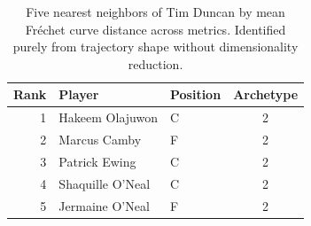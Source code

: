 \begin{table}[htbp]
  \centering\small
  \begin{tabular}{rllc}
    \toprule
    Rank & Player & Position & Archetype \\
    \midrule
    1 & Hakeem Olajuwon & C & 2 \\
    2 & Marcus Camby & F & 2 \\
    3 & Patrick Ewing & C & 2 \\
    4 & Shaquille O'Neal & C & 2 \\
    5 & Jermaine O'Neal & F & 2 \\
    \bottomrule
  \end{tabular}
  \caption{Five nearest neighbors of Tim Duncan by mean Fr\'{e}chet curve distance across metrics. Identified purely from trajectory shape without dimensionality reduction.}
  \label{tab:Tim_Duncan_frechet_curve_neighbors}
\end{table}

